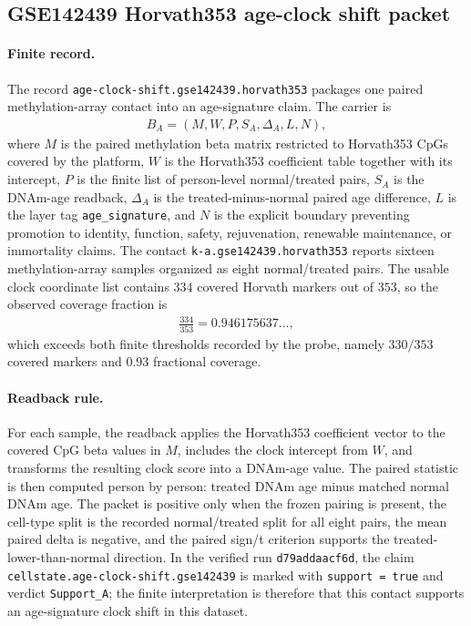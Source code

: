 \subsection{GSE142439 Horvath353 age-clock shift packet}
\label{sec:bioreality-age-clock-shift-gse142439-horvath353}

\paragraph{Finite record.}
The record \texttt{age-clock-shift.gse142439.horvath353} packages one paired methylation-array contact into an age-signature claim.  The carrier is
$$
\begin{aligned}
B_A=(M,W,P,S_A,\Delta_A,L,N),
\end{aligned}
$$
where $M$ is the paired methylation beta matrix restricted to Horvath353 CpGs covered by the platform, $W$ is the Horvath353 coefficient table together with its intercept, $P$ is the finite list of person-level normal/treated pairs, $S_A$ is the DNAm-age readback, $\Delta_A$ is the treated-minus-normal paired age difference, $L$ is the layer tag \texttt{age\_signature}, and $N$ is the explicit boundary preventing promotion to identity, function, safety, rejuvenation, renewable maintenance, or immortality claims.  The contact \texttt{k-a.gse142439.horvath353} reports sixteen methylation-array samples organized as eight normal/treated pairs.  The usable clock coordinate list contains $334$ covered Horvath markers out of $353$, so the observed coverage fraction is
$$
\begin{aligned}
\frac{334}{353}=0.946175637\ldots,
\end{aligned}
$$
which exceeds both finite thresholds recorded by the probe, namely $330/353$ covered markers and $0.93$ fractional coverage.

\paragraph{Readback rule.}
For each sample, the readback applies the Horvath353 coefficient vector to the covered CpG beta values in $M$, includes the clock intercept from $W$, and transforms the resulting clock score into a DNAm-age value.  The paired statistic is then computed person by person: treated DNAm age minus matched normal DNAm age.  The packet is positive only when the frozen pairing is present, the cell-type split is the recorded normal/treated split for all eight pairs, the mean paired delta is negative, and the paired sign/t criterion supports the treated-lower-than-normal direction.  In the verified run \texttt{d79addaacf6d}, the claim \texttt{cellstate.age-clock-shift.gse142439} is marked with \texttt{support = true} and verdict \texttt{Support\_A}; the finite interpretation is therefore that this contact supports an age-signature clock shift in this dataset.

